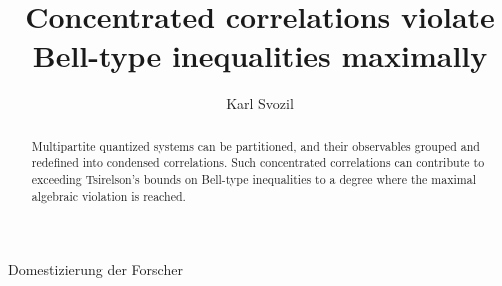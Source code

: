 \documentclass[prl,amsfonts,showpacs,preprint,showkeys]{revtex4}
\begin{document}



\title{Concentrated correlations violate Bell-type inequalities maximally}

\author{Karl Svozil}


\begin{abstract}
Multipartite quantized systems can be partitioned,
and their observables grouped and redefined into condensed correlations.
Such concentrated correlations can contribute to exceeding
Tsirelson's bounds on Bell-type inequalities to a degree where the maximal
algebraic violation is reached.
\end{abstract}


\maketitle

Domestizierung der Forscher
\end{document}
